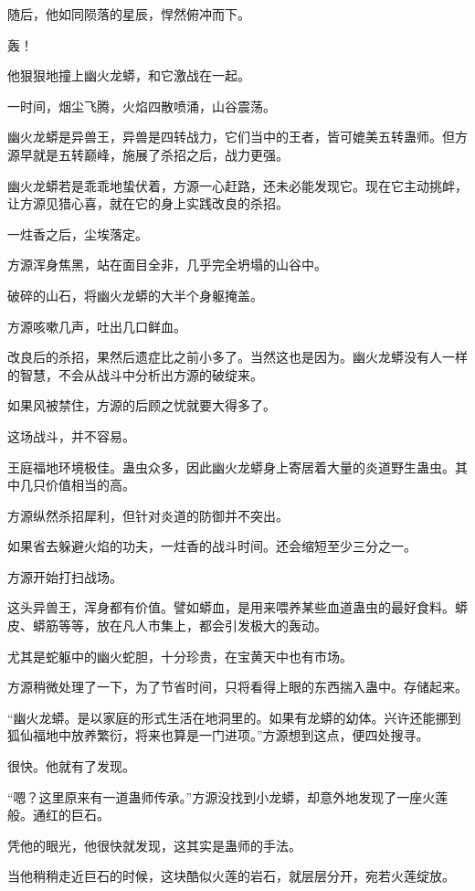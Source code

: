 \begin{this_body}
随后，他如同陨落的星辰，悍然俯冲而下。

轰！

他狠狠地撞上幽火龙蟒，和它激战在一起。

一时间，烟尘飞腾，火焰四散喷涌，山谷震荡。

幽火龙蟒是异兽王，异兽是四转战力，它们当中的王者，皆可媲美五转蛊师。但方源早就是五转巅峰，施展了杀招之后，战力更强。

幽火龙蟒若是乖乖地蛰伏着，方源一心赶路，还未必能发现它。现在它主动挑衅，让方源见猎心喜，就在它的身上实践改良的杀招。

一炷香之后，尘埃落定。

方源浑身焦黑，站在面目全非，几乎完全坍塌的山谷中。

破碎的山石，将幽火龙蟒的大半个身躯掩盖。

方源咳嗽几声，吐出几口鲜血。

改良后的杀招，果然后遗症比之前小多了。当然这也是因为。幽火龙蟒没有人一样的智慧，不会从战斗中分析出方源的破绽来。

如果风被禁住，方源的后顾之忧就要大得多了。

这场战斗，并不容易。

王庭福地环境极佳。蛊虫众多，因此幽火龙蟒身上寄居着大量的炎道野生蛊虫。其中几只价值相当的高。

方源纵然杀招犀利，但针对炎道的防御并不突出。

如果省去躲避火焰的功夫，一炷香的战斗时间。还会缩短至少三分之一。

方源开始打扫战场。

这头异兽王，浑身都有价值。譬如蟒血，是用来喂养某些血道蛊虫的最好食料。蟒皮、蟒筋等等，放在凡人市集上，都会引发极大的轰动。

尤其是蛇躯中的幽火蛇胆，十分珍贵，在宝黄天中也有市场。

方源稍微处理了一下，为了节省时间，只将看得上眼的东西揣入蛊中。存储起来。

“幽火龙蟒。是以家庭的形式生活在地洞里的。如果有龙蟒的幼体。兴许还能挪到狐仙福地中放养繁衍，将来也算是一门进项。”方源想到这点，便四处搜寻。

很快。他就有了发现。

“嗯？这里原来有一道蛊师传承。”方源没找到小龙蟒，却意外地发现了一座火莲般。通红的巨石。

凭他的眼光，他很快就发现，这其实是蛊师的手法。

当他稍稍走近巨石的时候，这块酷似火莲的岩石，就层层分开，宛若火莲绽放。


\end{this_body}

